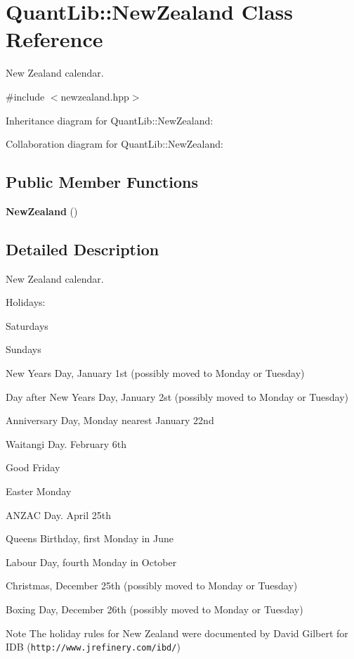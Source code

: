 \section{Quant\+Lib\+:\+:New\+Zealand Class Reference}
\label{class_quant_lib_1_1_new_zealand}


New Zealand calendar.  




{\ttfamily \#include $<$newzealand.\+hpp$>$}



Inheritance diagram for Quant\+Lib\+:\+:New\+Zealand\+:


Collaboration diagram for Quant\+Lib\+:\+:New\+Zealand\+:
\subsection*{Public Member Functions}
\begin{DoxyCompactItemize}
\item 
{\bf New\+Zealand} ()
\end{DoxyCompactItemize}


\subsection{Detailed Description}
New Zealand calendar. 

Holidays\+: 
\begin{DoxyItemize}
\item Saturdays 
\item Sundays 
\item New Year\textquotesingle{}s Day, January 1st (possibly moved to Monday or Tuesday) 
\item Day after New Year\textquotesingle{}s Day, January 2st (possibly moved to Monday or Tuesday) 
\item Anniversary Day, Monday nearest January 22nd 
\item Waitangi Day. February 6th 
\item Good Friday 
\item Easter Monday 
\item A\+N\+Z\+AC Day. April 25th 
\item Queen\textquotesingle{}s Birthday, first Monday in June 
\item Labour Day, fourth Monday in October 
\item Christmas, December 25th (possibly moved to Monday or Tuesday) 
\item Boxing Day, December 26th (possibly moved to Monday or Tuesday) 
\end{DoxyItemize}\begin{DoxyNote}{Note}
The holiday rules for New Zealand were documented by David Gilbert for I\+DB ({\tt http\+://www.\+jrefinery.\+com/ibd/}) 
\end{DoxyNote}


